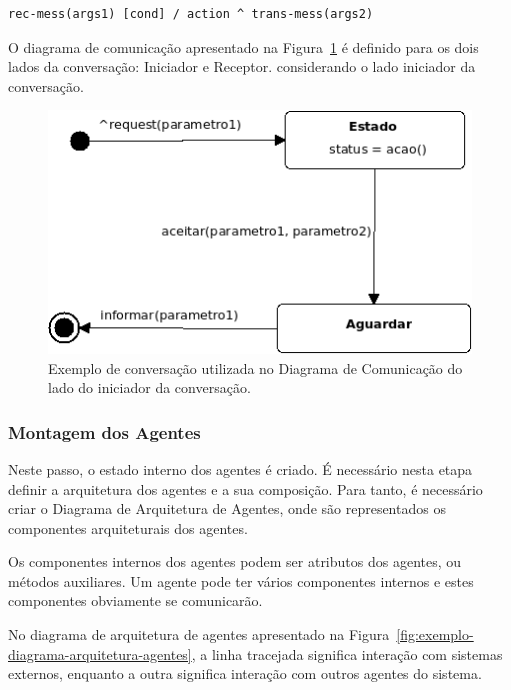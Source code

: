 \begin{lstlisting}[label=code:sintaxe-conversation,caption=Sintaxe da conversação entre dois agentes.]
	rec-mess(args1) [cond] / action ^ trans-mess(args2)
\end{lstlisting}

O diagrama de comunicação apresentado na Figura~\ref{fig:exemplo-conversation} é definido para os dois lados da conversação: Iniciador e Receptor. considerando o lado iniciador da conversação.

\begin{figure}
	\centering
	\includegraphics[scale=0.65]{images/exemplo-conversation.png}
	\caption{Exemplo de conversação utilizada no Diagrama de Comunicação do lado do iniciador da conversação.}
	\label{fig:exemplo-conversation}
\end{figure}

\subsubsection{Montagem dos Agentes}

Neste passo, o estado interno dos agentes é criado. É necessário nesta etapa definir a arquitetura dos agentes e a sua composição. Para tanto, é necessário criar o Diagrama de Arquitetura de Agentes, onde são representados os componentes arquiteturais dos agentes.

Os componentes internos dos agentes podem ser atributos dos agentes, ou métodos auxiliares. Um agente pode ter vários componentes internos e estes componentes obviamente se comunicarão.

No diagrama de arquitetura de agentes apresentado na Figura~\ref{fig:exemplo-diagrama-arquitetura-agentes}, a linha tracejada significa interação com sistemas externos, enquanto a outra significa interação com outros agentes do sistema.

